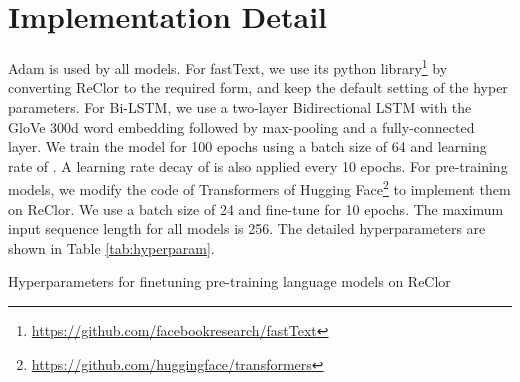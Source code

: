 \documentclass{article} \usepackage{iclr2020_conference,times}
\begin{document}
\section{Implementation Detail}
\label{appendix-implementation-detail}
Adam is used by all models. For fastText, we use its python library\footnote{\url{https://github.com/facebookresearch/fastText}} by converting ReClor to the required form, and keep the default setting of the hyper parameters. For Bi-LSTM, we use a two-layer Bidirectional LSTM with the GloVe 300d word embedding \citep{pennington2014glove} followed by max-pooling and a fully-connected layer. We train the model for 100 epochs using a batch size of 64 and learning rate of . A learning rate decay of  is also applied every 10 epochs. 
For pre-training models, we modify the code of Transformers of Hugging Face\footnote{\url{https://github.com/huggingface/transformers}} to implement them on ReClor. We use a batch size of 24 and fine-tune for 10 epochs. The maximum input sequence length for all models is 256. The detailed hyperparameters are shown in Table \ref{tab:hyperparam}.

	\begin{table}
	\caption{Hyperparameters for finetuning pre-training language models on ReClor}
	\label{tab:hyperparam}
	\centering
    \small
	\resizebox{1.0\textwidth}{!}{}
	\end{table}
\end{document}
